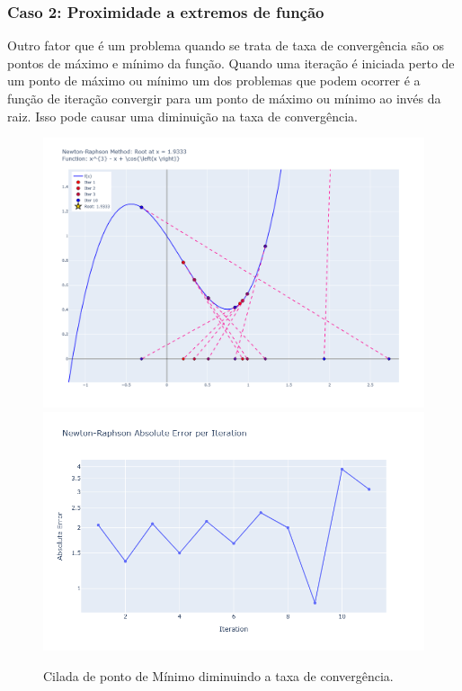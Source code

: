 \subsubsection{Caso 2: Proximidade a extremos de função}
Outro fator que é um problema quando se trata de taxa de convergência são os pontos de máximo e mínimo da função. Quando uma iteração é iniciada perto de um ponto de máximo ou mínimo um dos problemas que podem ocorrer é a função de iteração convergir para um ponto de máximo ou mínimo ao invés da raiz. Isso pode causar uma diminuição na taxa de convergência.
\begin{figure}[H]
    \centering 
    \includegraphics[width=1\textwidth]{Imagens/pitfalls/02/max_min.png}
    \includegraphics[width=1\textwidth]{Imagens/pitfalls/02/err_max_min.png}
    \caption{Cilada de ponto de Mínimo diminuindo a taxa de convergência.}
    \label{fig:ciladaMinMax_A}
\end{figure}

